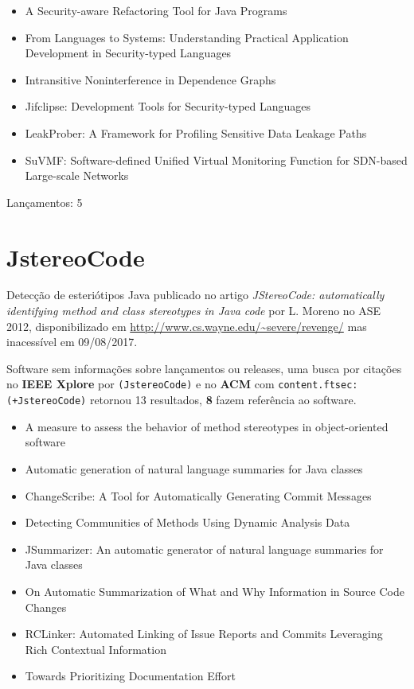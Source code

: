 \begin{itemize}
\item A Security-aware Refactoring Tool for Java Programs
\item From Languages to Systems: Understanding Practical Application Development in Security-typed Languages
\item Intransitive Noninterference in Dependence Graphs
\item Jifclipse: Development Tools for Security-typed Languages
\item LeakProber: A Framework for Profiling Sensitive Data Leakage Paths
\item SuVMF: Software-defined Unified Virtual Monitoring Function for SDN-based Large-scale Networks
\end{itemize}

Lançamentos: 5

\section{JstereoCode}

Detecção de esteriótipos Java
publicado no artigo {\it JStereoCode: automatically identifying method and class stereotypes in Java code}
por L. Moreno
no ASE 2012,
disponibilizado em \url{http://www.cs.wayne.edu/~severe/revenge/}
mas inacessível em 09/08/2017.

Software sem informações sobre lançamentos ou releases,
uma busca por citações no {\bf IEEE Xplore} por
\texttt{(JstereoCode)}
e no {\bf ACM} com
\texttt{content.ftsec:(+JstereoCode)}
retornou
13 resultados,
{\bf 8} fazem referência ao software.

\begin{itemize}
\item A measure to assess the behavior of method stereotypes in object-oriented software
\item Automatic generation of natural language summaries for Java classes
\item ChangeScribe: A Tool for Automatically Generating Commit Messages
\item Detecting Communities of Methods Using Dynamic Analysis Data
\item JSummarizer: An automatic generator of natural language summaries for Java classes
\item On Automatic Summarization of What and Why Information in Source Code Changes
\item RCLinker: Automated Linking of Issue Reports and Commits Leveraging Rich Contextual Information
\item Towards Prioritizing Documentation Effort
\end{itemize}



